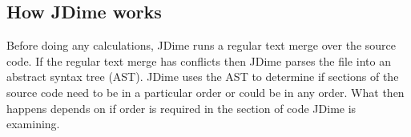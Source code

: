 \subsection{How JDime works}

Before doing any calculations, JDime runs a regular text merge over the source code.  
If the regular text merge has conflicts then JDime parses the file into an abstract syntax tree (AST).  
JDime uses the AST to determine if sections of the source code need to be in a particular order or could be in any order.
What then happens depends on if order is required in the section of code JDime is examining.


